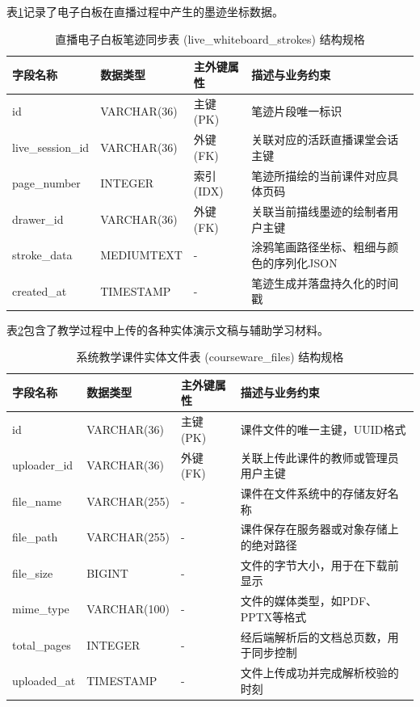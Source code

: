 表\ref{tab:db-live-whiteboard-strokes}记录了电子白板在直播过程中产生的墨迹坐标数据。

\begin{table}[H]
\centering
\caption{直播电子白板笔迹同步表 (live\_whiteboard\_strokes) 结构规格}
\label{tab:db-live-whiteboard-strokes}
\begin{tabularx}{\textwidth}{lllX}
\toprule
字段名称 & 数据类型 & 主外键属性 & 描述与业务约束 \\
\midrule
id & VARCHAR(36) & 主键 (PK) & 笔迹片段唯一标识 \\
live\_session\_id & VARCHAR(36) & 外键 (FK) & 关联对应的活跃直播课堂会话主键 \\
page\_number & INTEGER & 索引 (IDX) & 笔迹所描绘的当前课件对应具体页码 \\
drawer\_id & VARCHAR(36) & 外键 (FK) & 关联当前描线墨迹的绘制者用户主键 \\
stroke\_data & MEDIUMTEXT & - & 涂鸦笔画路径坐标、粗细与颜色的序列化JSON \\
created\_at & TIMESTAMP & - & 笔迹生成并落盘持久化的时间戳 \\
\bottomrule
\end{tabularx}
\end{table}

表\ref{tab:db-courseware-files}包含了教学过程中上传的各种实体演示文稿与辅助学习材料。

\begin{table}[H]
\centering
\caption{系统教学课件实体文件表 (courseware\_files) 结构规格}
\label{tab:db-courseware-files}
\begin{tabularx}{\textwidth}{lllX}
\toprule
字段名称 & 数据类型 & 主外键属性 & 描述与业务约束 \\
\midrule
id & VARCHAR(36) & 主键 (PK) & 课件文件的唯一主键，UUID格式 \\
uploader\_id & VARCHAR(36) & 外键 (FK) & 关联上传此课件的教师或管理员用户主键 \\
file\_name & VARCHAR(255) & - & 课件在文件系统中的存储友好名称 \\
file\_path & VARCHAR(255) & - & 课件保存在服务器或对象存储上的绝对路径 \\
file\_size & BIGINT & - & 文件的字节大小，用于在下载前显示 \\
mime\_type & VARCHAR(100) & - & 文件的媒体类型，如PDF、PPTX等格式 \\
total\_pages & INTEGER & - & 经后端解析后的文档总页数，用于同步控制 \\
uploaded\_at & TIMESTAMP & - & 文件上传成功并完成解析校验的时刻 \\
\bottomrule
\end{tabularx}
\end{table}

